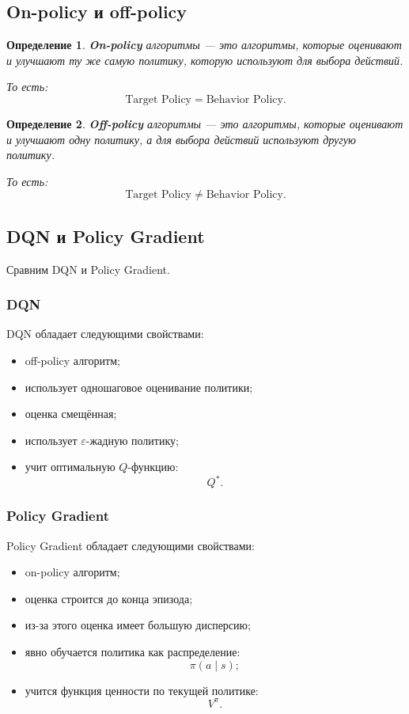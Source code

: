 \documentclass[12pt,a4paper]{article}
\newtheorem{definition}{Определение}
\begin{document}
\subsection{On-policy и off-policy}

\begin{definition}
\textbf{On-policy} алгоритмы --- это алгоритмы, которые оценивают и улучшают ту же самую политику, которую используют для выбора действий.

То есть:
\[
\text{Target Policy}
=
\text{Behavior Policy}.
\]
\end{definition}

\begin{definition}
\textbf{Off-policy} алгоритмы --- это алгоритмы, которые оценивают и улучшают одну политику, а для выбора действий используют другую политику.

То есть:
\[
\text{Target Policy}
\ne
\text{Behavior Policy}.
\]
\end{definition}

\subsection{DQN и Policy Gradient}

Сравним DQN и Policy Gradient.

\subsubsection{DQN}

DQN обладает следующими свойствами:
\begin{itemize}
    \item off-policy алгоритм;
    \item использует одношаговое оценивание политики;
    \item оценка смещённая;
    \item использует $\varepsilon$-жадную политику;
    \item учит оптимальную $Q$-функцию:
    \[
    Q^\ast.
    \]
\end{itemize}

\subsubsection{Policy Gradient}

Policy Gradient обладает следующими свойствами:
\begin{itemize}
    \item on-policy алгоритм;
    \item оценка строится до конца эпизода;
    \item из-за этого оценка имеет большую дисперсию;
    \item явно обучается политика как распределение:
    \[
    \pi(a\mid s);
    \]
    \item учится функция ценности по текущей политике:
    \[
    V^\pi.
    \]
\end{itemize}
\end{document}
